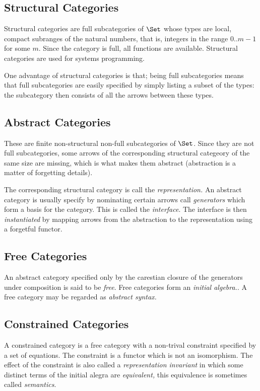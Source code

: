 \subsection{Structural Categories}
Structural categories are full subcategories of $\Set$ whose
types are local, compact subranges of the natural numbers,
that is, integers in the range $0..m-1$ for some $m$.
Since the category is full, all functions are available.
Structural categories are used for systems programming.

One advantage of structural categories is that; being full subcategories
means that full subcategories are easily specified by simply
listing a subset of the types: the subcategory then consists of
all the arrows between these types.

\subsection{Abstract Categories}
These are finite non-structural non-full subcategories of $\Set$.
Since they are not full subcategories, some arrows of the corresponding
structural categeory of the same size are missing, which is what makes
them abstract (abstraction is a matter of forgetting details).

The corresponding structural category is call the {\em representation.}
An abstract category is usually specify by nominating certain arrows
call {\em generators} which form a basis for the category. This is called
the {\em interface}. The interface is then {\em instantiated} by
mapping arrows from the abstraction to the representation using
a forgetful functor.

\subsection{Free Categories}
An abstract category specified only by the carestian closure of the generators 
under composition is said to be {\em free}. Free categories form an {\em initial
algebra.}. A free category may be regarded as {\em abstract syntax.}

\subsection{Constrained Categories}
A constrained category is a free category with a non-trival constraint 
specified by a set of equations. The constraint is a functor which is not an isomorphism. 
The effect of the constraint is also called a {\em representation invariant}
in which some distinct terms of the initial alegra are {\em equivalent,}
this equivalence is sometimes called {\em semantics}.

